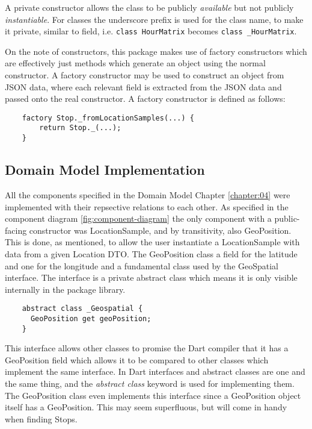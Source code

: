 A private constructor allows the class to be publicly \textit{available} but not publicly \textit{instantiable}. For classes the underscore prefix is used for the class name, to make it private, similar to field, i.e. \verb|class HourMatrix| becomes \verb|class _HourMatrix|.

On the note of constructors, this package makes use of factory constructors which are effectively just methods which generate an object using the normal constructor. A factory constructor may be used to construct an object from JSON data, where each relevant field is extracted from the JSON data and passed onto the real constructor. A factory constructor is defined as follows:
\begin{verbatim}
    factory Stop._fromLocationSamples(...) {
        return Stop._(...);
    }
\end{verbatim}

\subsection{Domain Model Implementation}
All the components specified in the Domain Model Chapter \ref{chapter:04} were implemented with their repsective relations to each other. As specified in the component diagram \ref{fig:component-diagram} the only component with a public-facing constructor was LocationSample, and by transitivity, also GeoPosition. This is done, as mentioned, to allow the user instantiate a LocationSample with data from a given Location DTO. The GeoPosition class a field for the latitude and one for the longitude and a fundamental class used by the GeoSpatial interface. The interface is a private abstract class which means it is only visible internally in the package library.

\begin{verbatim}
    abstract class _Geospatial {
      GeoPosition get geoPosition;
    }
\end{verbatim}

This interface allows other classes to promise the Dart compiler that it has a GeoPosition field which allows it to be compared to other classes which implement the same interface. In Dart interfaces and abstract classes are one and the same thing, and the \textit{abstract class} keyword is used for implementing them. The GeoPosition class even implements this interface since a GeoPosition object itself has a GeoPosition. This may seem superfluous, but will come in handy when finding Stops.

